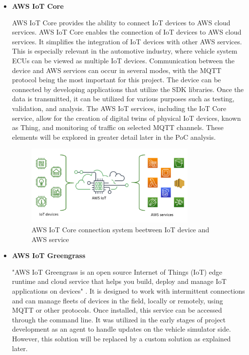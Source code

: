 \begin{itemize}
    \item \textbf{AWS IoT Core} 
    
    AWS IoT Core provides the ability to connect IoT devices to AWS cloud services. AWS IoT Core enables the connection of IoT devices to AWS cloud services. It simplifies the integration of IoT devices with other AWS services. This is especially relevant in the automotive industry, where vehicle system ECUs can be viewed as multiple IoT devices. Communication between the device and AWS services can occur in several modes, with the MQTT protocol being the most important for this project. The device can be connected by developing applications that utilize the SDK libraries. Once the data is transmitted, it can be utilized for various purposes such as testing, validation, and analysis. The AWS IoT services, including the IoT Core service, allow for the creation of digital twins of physical IoT devices, known as Thing, and monitoring of traffic on selected MQTT channels. These elements will be explored in greater detail later in the PoC analysis.
    \begin{figure}[h]  %
        \centering
        \includegraphics[width=0.8\textwidth]{images/AWSIoTCore.png}  %
        \caption{AWS IoT Core connection system beetween IoT device and AWS service \cite{AWSIoTCore}}
        \label{fig:AWSIoTCore}
    \end{figure}

    \item \textbf{AWS IoT Greengrass}
    
    "AWS IoT Greengrass is an open source Internet of Things (IoT) edge runtime and cloud service that helps you build, deploy and manage IoT applications on devices" \cite{AWSIoTGreengrass}. It is designed to work with intermittent connections and can manage fleets of devices in the field, locally or remotely, using MQTT or other protocols. Once installed, this service can be accessed through the command line. It was utilized in the early stages of project development as an agent to handle updates on the vehicle simulator side. However, this solution will be replaced by a custom solution as explained later.
    

\end{itemize}
